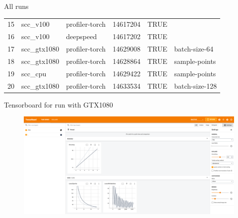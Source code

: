 \documentclass[compress,aspectratio=169]{beamer}
\begin{document}
\begin{frame}{All runs}
{\begin{table}[]
\begin{tabular}{@{}llllll@{}}
15  & scc\_v100    & profiler-torch & 14617204 & TRUE      &                \\
16  & scc\_v100    & deepspeed      & 14617202 & TRUE      &                \\
17  & scc\_gtx1080 & profiler-torch & 14629008 & TRUE      & batch-size-64  \\
18  & scc\_gtx1080 & profiler-torch & 14628864 & TRUE      & sample-points  \\
19  & scc\_cpu     & profiler-torch & 14629422 & TRUE      & sample-points  \\
20  & scc\_gtx1080 & profiler-torch & 14633534 & TRUE      & batch-size-128 \\ \bottomrule
\end{tabular}
\end{table}
}
\end{frame}

\begin{frame}{Tensorboard for run with GTX1080}

\begin{center}
    \begin{figure}
        \includegraphics[width=1\textwidth]{../../data/scap_gtx1080_tensorboard_14615343}
    \end{figure}
    \end{center}

\end{frame}
\end{document}
